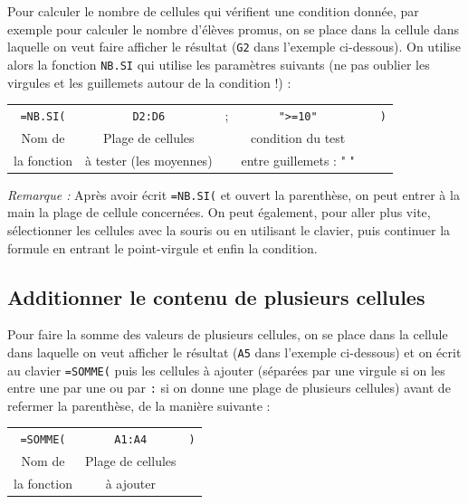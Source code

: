 Pour calculer le nombre de cellules qui vérifient une condition donnée, par exemple pour calculer le nombre d'élèves promus, on se place dans la cellule dans laquelle on veut faire afficher le résultat (\texttt{G2} dans l'exemple ci-dessous). On utilise alors la fonction \texttt{NB.SI} qui utilise les paramètres suivants (ne pas oublier les virgules et les guillemets autour de la condition !) :


\begin{center}
	\begin{tabular}{cccccc}
		\texttt{=NB.SI(} & \texttt{D2:D6} & ; & \texttt{">=10"} &  &  \texttt{)} \\  
		Nom de & Plage de cellules  & & condition du test &  & \\
		la fonction & à tester (les moyennes) & &  entre guillemets : " " & & \\  
	\end{tabular}
\end{center}



\emph{Remarque :} Après avoir écrit \texttt{=NB.SI(} et ouvert la parenthèse, on peut entrer à la main la plage de cellule concernées. On peut également, pour aller plus vite, sélectionner les cellules avec la souris ou en utilisant le clavier, puis continuer la formule en entrant le point-virgule et enfin la condition.



\subsection{Additionner le contenu de plusieurs cellules}\label{Calc3Somme}

Pour faire la somme des valeurs de plusieurs cellules, on se place dans la cellule dans laquelle on veut afficher le résultat (\texttt{A5} dans l'exemple ci-dessous) et on écrit au clavier \texttt{=SOMME(} puis les cellules à ajouter (séparées par une virgule si on les entre une par une ou par \texttt{:} si on donne une plage de plusieurs cellules) avant de refermer la parenthèse, de la manière suivante :

\begin{center}
	\begin{tabular}{ccc}
		\texttt{=SOMME(} & \texttt{A1:A4} &   \texttt{)} \\  
		Nom de & Plage de cellules  & \\
		la fonction & à ajouter & \\  
	\end{tabular}
\end{center}

